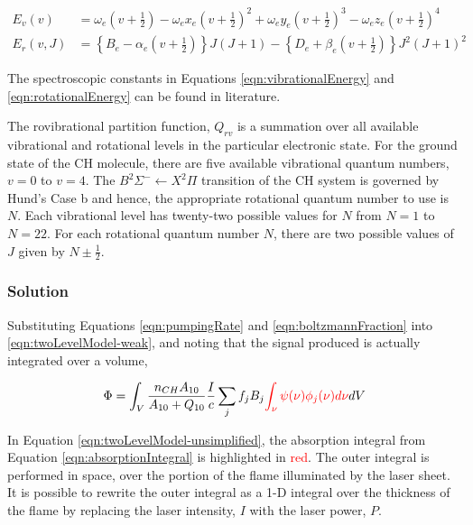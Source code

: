 \begin{align}
  E_v(v) &= \omega_e \left(v+\frac{1}{2}\right) - \omega_ex_e \left(v+\frac{1}{2}\right)^2 + \omega_ey_e \left(v+\frac{1}{2}\right)^3 - \omega_ez_e \left(v+\frac{1}{2}\right)^4
  \label{eqn:vibrationalEnergy}\\
  E_r(v, J) &= \left\{B_e - \alpha_e \left(v+\frac{1}{2}\right)\right\}J(J+1) - \left\{D_e + \beta_e \left(v+\frac{1}{2}\right)\right\}J^2(J+1)^2
  \label{eqn:rotationalEnergy}
\end{align}

The spectroscopic constants in Equations \ref{eqn:vibrationalEnergy} and \ref{eqn:rotationalEnergy} can be found in literature\cite{1995-zachwieja}.

The rovibrational partition function, \(Q_{rv}\) is a summation over all available vibrational and rotational levels in the particular electronic state.
For the ground state of the CH molecule, there are five available vibrational quantum numbers, \(v = 0\) to \(v = 4\).
The \(B^2\Sigma^-\leftarrow X^2\Pi\) transition of the CH system is governed by Hund's Case b and hence, the appropriate rotational quantum number to use is \(N\).
Each vibrational level has twenty-two possible values for \(N\) from \(N = 1\) to \(N = 22\).
For each rotational quantum number \(N\), there are two possible values of \(J\) given by \(N \pm \frac{1}{2}\).

\subsubsection{Solution}
\label{subsubsec:basic-model-solution}

Substituting Equations \ref{eqn:pumpingRate} and \ref{eqn:boltzmannFraction} into \ref{eqn:twoLevelModel-weak}, and noting that the signal produced is actually integrated over a volume,

\begin{equation}
  \Phi = \int_V \frac{n_{CH} A_{10}}{A_{10} + Q_{10}} \frac{I}{c} \sum_j f_j B_j \textcolor{red}{\int_\nu \psi(\nu) \phi_j(\nu) d\nu} dV
  \label{eqn:twoLevelModel-unsimplified}
\end{equation}

In Equation \ref{eqn:twoLevelModel-unsimplified}, the absorption integral from Equation \ref{eqn:absorptionIntegral} is highlighted in \textcolor{red}{red}.
The outer integral is performed in space, over the portion of the flame illuminated by the laser sheet.
It is possible to rewrite the outer integral as a 1-D integral over the thickness of the flame by replacing the laser intensity, \(I\) with the laser power, \(P\).

